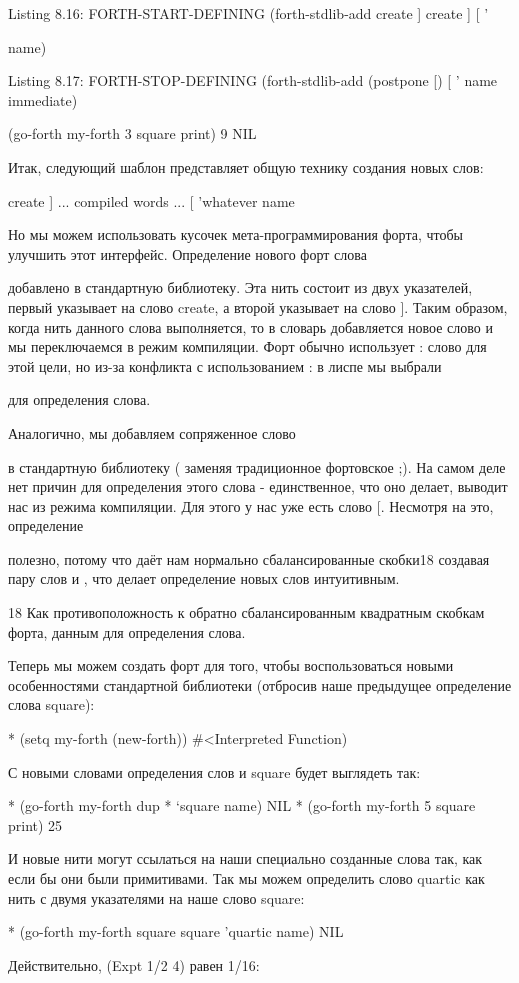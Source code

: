 Listing 8.16: FORTH-START-DEFINING
(forth-stdlib-add
create
] create ] [
’{ name)

Listing 8.17: FORTH-STOP-DEFINING
(forth-stdlib-add
{ (postpone [) [
’} name immediate)

(go-forth my-forth
3 square print)
9
NIL

Итак, следующий шаблон представляет общую технику создания новых слов:

create
] ... compiled words ... [
’whatever name

Но мы можем использовать кусочек мета-программирования форта, чтобы улучшить этот интерфейс. Определение  нового форт слова { добавлено в стандартную библиотеку. Эта нить состоит из двух указателей, первый указывает на слово create, а второй указывает на слово ]. Таким образом, когда нить данного слова выполняется, то в словарь добавляется новое слово и мы переключаемся в режим компиляции. Форт обычно использует : слово для этой цели, но из-за конфликта с использованием : в лиспе мы выбрали { для определения слова.

Аналогично, мы добавляем сопряженное слово } в стандартную библиотеку ( заменяя традиционное фортовское ;). На самом деле нет причин для определения этого слова - единственное, что оно делает, выводит нас из режима компиляции. Для этого у нас уже есть слово [. Несмотря на это, определение { полезно, потому что даёт нам нормально сбалансированные скобки18 создавая пару слов { и }, что делает определение новых слов интуитивным.

18 Как противоположность к обратно сбалансированным квадратным скобкам форта, данным для определения слова.

Теперь мы можем создать форт для того, чтобы воспользоваться новыми особенностями стандартной библиотеки (отбросив наше предыдущее определение слова square):

* (setq my-forth (new-forth))
#<Interpreted Function)

С новыми словами определения слов { и } square будет выглядеть так:

* (go-forth my-forth
{ dup * } ‘square name)
NIL
* (go-forth my-forth
5 square print)
25

И новые нити могут ссылаться на наши специально созданные слова так, как если бы они были примитивами. Так мы можем определить слово quartic как нить с двумя указателями на наше слово square:

* (go-forth my-forth
{ square square } ’quartic name)
NIL

Действительно, (Expt 1/2 4) равен 1/16:

}}}
